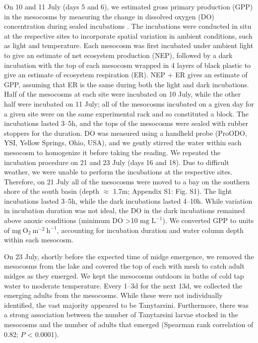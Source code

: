 \documentclass[12pt]{article}
\begin{document}
On 10 and 11 July (days 5 and 6), 
we estimated gross primary production (GPP) in the mesocosms by measuring the change in
dissolved oxygen (DO) concentration during sealed incubations 
\citep[similar to][]{phillips2019}.
The incubations were conducted in situ at the respective sites to incorporate
spatial variation in ambient conditions, such as light and temperature.
Each mesocosm was first incubated under ambient light to give an
estimate of net ecosystem production (NEP),
followed by a dark incubation with the top of each mesocosm wrapped
in 4 layers of black plastic to give an estimate of ecosystem respiration (ER).
NEP + ER gives an estimate of GPP, assuming that ER is the same during both the light
and dark incubations. Half of the mesocosms at each site were incubated on 10 July,
while the other half were incubated on 11 July;
all of the mesocosms incubated on a given day for a given site were on the same 
experimental rack and so constituted a block.
The incubations lasted 3--5h, 
and the tops of the mesocosms were sealed with rubber stoppers for the duration.
DO was measured using a handheld probe (ProODO, YSI, Yellow Springs, Ohio, USA),
and we gently stirred the water within each mesocosm to homogenize it 
before taking the reading. 
We repeated the incubation procedure on 21 and 23 July (days 16 and 18).
Due to difficult weather, 
we were unable to perform the incubations at the respective sites.
Therefore, on 21 July all of the mesocosms were moved to a bay on the
southern shore of the south basin (depth $\approx$ 1.7m; Appendix S1: Fig. S1).
The light incubations lasted 3--5h,
while the dark incubations lasted 4--10h.
While variation in incubation duration was not ideal,
the DO in the dark incubations remained above anoxic conditions 
(minimum DO >10 $\text{mg L}^{-1}$). 
We converted GPP to units of $\text{mg}~\text{O}_2~\text{m}^{-2}~\text{h}^{-1}$,
accounting for incubation duration and water column depth within each mesocosm.

On 23 July, shortly before the expected time of midge emergence,
we removed the mesocosms from the lake and covered the top of each with mesh
to catch adult midges as they emerged. 
We kept the mesocosms outdoors in baths of cold tap water 
to moderate temperature.
Every 1--3d for the next 13d, we collected the emerging adults from the mesocosms.
While these were not individually identified, the vast majority appeared to be Tanytarsini.
Furthermore, there was a strong association between the number of Tanytarsini larvae 
stocked in the mesocosms and the number of adults that emerged 
(Spearman rank correlation of 0.82; $\textit{P}$ < 0.0001).
\end{document}
